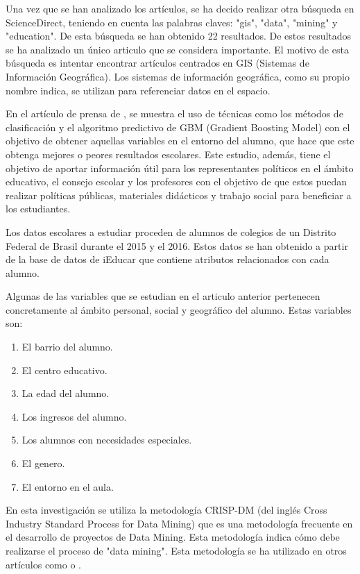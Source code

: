 Una vez que se han analizado los artículos, se ha decido realizar otra búsqueda en ScienceDirect, teniendo en cuenta las palabras claves: "gis", "data", "mining" y "education". De esta búsqueda se han obtenido 22 resultados. De estos resultados se ha analizado un único articulo que se considera importante. El motivo de esta búsqueda es intentar encontrar artículos centrados en GIS (Sistemas de Información Geográfica). Los sistemas de información geográfica, como su propio nombre indica, se utilizan para referenciar datos en el espacio.

En el artículo de prensa de , se muestra el uso de técnicas como los métodos de clasificación y el algoritmo predictivo de GBM (Gradient Boosting Model) con el objetivo de obtener aquellas variables en el entorno del alumno, que hace que este obtenga mejores o peores resultados escolares. Este estudio, además, tiene el objetivo de aportar información útil para los representantes políticos en el ámbito educativo, el consejo escolar y los profesores con el objetivo de que estos puedan realizar políticas públicas, materiales didácticos y trabajo social para beneficiar a los estudiantes.

Los datos escolares a estudiar proceden de alumnos de colegios de un Distrito Federal de Brasil durante el 2015 y el 2016. Estos datos se han obtenido a partir de la base de datos de iEducar que contiene atributos relacionados con cada alumno. 

Algunas de las variables que se estudian en el articulo anterior pertenecen concretamente al ámbito personal, social y geográfico del alumno. Estas variables son:
\begin{multicols}{2}
\begin{enumerate}[itemsep=0mm]
\item El barrio del alumno.
\item El centro educativo.
\item La edad del alumno.
\item Los ingresos del alumno.
\item Los alumnos con necesidades especiales.
\item El genero. 
\item El entorno en el aula.
\end{enumerate}
\end{multicols}

En esta investigación se utiliza la metodología CRISP-DM (del inglés Cross Industry Standard Process for Data Mining) que es una metodología frecuente en el desarrollo de proyectos de Data Mining. Esta metodología indica cómo debe realizarse el proceso de "data mining". Esta metodología se ha utilizado en otros artículos como  o \cite{SEN20129468}.

